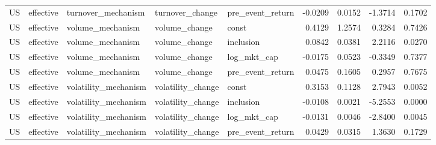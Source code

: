 \begin{tabular}{lllllrrrr}
US & effective & turnover_mechanism & turnover_change & pre_event_return & -0.0209 & 0.0152 & -1.3714 & 0.1702 \\
US & effective & volume_mechanism & volume_change & const & 0.4129 & 1.2574 & 0.3284 & 0.7426 \\
US & effective & volume_mechanism & volume_change & inclusion & 0.0842 & 0.0381 & 2.2116 & 0.0270 \\
US & effective & volume_mechanism & volume_change & log_mkt_cap & -0.0175 & 0.0523 & -0.3349 & 0.7377 \\
US & effective & volume_mechanism & volume_change & pre_event_return & 0.0475 & 0.1605 & 0.2957 & 0.7675 \\
US & effective & volatility_mechanism & volatility_change & const & 0.3153 & 0.1128 & 2.7943 & 0.0052 \\
US & effective & volatility_mechanism & volatility_change & inclusion & -0.0108 & 0.0021 & -5.2553 & 0.0000 \\
US & effective & volatility_mechanism & volatility_change & log_mkt_cap & -0.0131 & 0.0046 & -2.8400 & 0.0045 \\
US & effective & volatility_mechanism & volatility_change & pre_event_return & 0.0429 & 0.0315 & 1.3630 & 0.1729 \\
\bottomrule
\end{tabular}
